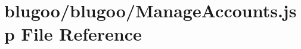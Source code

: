 \hypertarget{ManageAccounts_8jsp}{
\section{blugoo/blugoo/ManageAccounts.jsp File Reference}
\label{ManageAccounts_8jsp}
}


